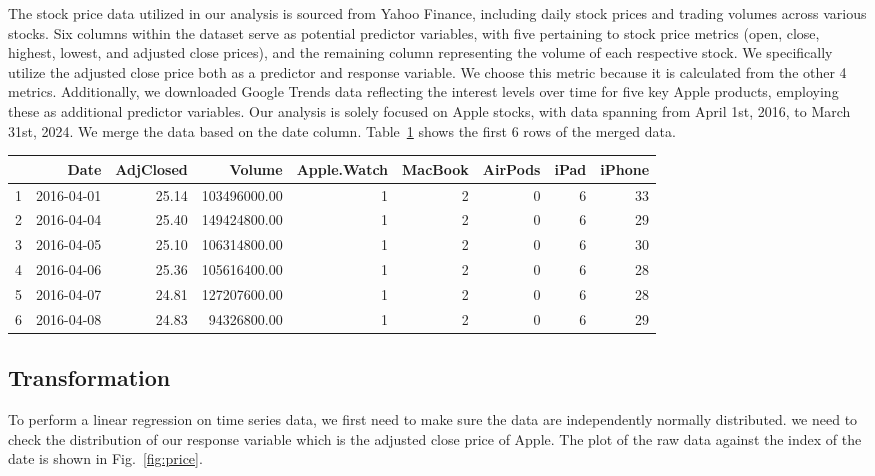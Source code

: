 \documentclass[conference,onecolumn,11pt]{IEEEtran}
\begin{document}
The stock price data utilized in our analysis is sourced from Yahoo Finance, including daily stock prices and trading volumes across various stocks. Six columns within the dataset serve as potential predictor variables, with five pertaining to stock price metrics (open, close, highest, lowest, and adjusted close prices), and the remaining column representing the volume of each respective stock. We specifically utilize the adjusted close price both as a predictor and response variable. We choose this metric because it is calculated from the other 4 metrics. Additionally, we downloaded Google Trends data reflecting the interest levels over time for five key Apple products, employing these as additional predictor variables. Our analysis is solely focused on Apple stocks, with data spanning from April 1st, 2016, to March 31st, 2024. We merge the data based on the date column. Table~\ref{tab:merged_data} shows the first 6 rows of the merged data.

\begin{table}[ht]
\centering
\begin{tabular}{rrrrrrrrr}
  \hline
 & Date & AdjClosed & Volume & Apple.Watch & MacBook & AirPods & iPad & iPhone \\ 
  \hline
1 & 2016-04-01 & 25.14 & 103496000.00 &   1 &   2 &   0 &   6 &  33 \\ 
  2 & 2016-04-04 & 25.40 & 149424800.00 &   1 &   2 &   0 &   6 &  29 \\ 
  3 & 2016-04-05 & 25.10 & 106314800.00 &   1 &   2 &   0 &   6 &  30 \\ 
  4 & 2016-04-06 & 25.36 & 105616400.00 &   1 &   2 &   0 &   6 &  28 \\ 
  5 & 2016-04-07 & 24.81 & 127207600.00 &   1 &   2 &   0 &   6 &  28 \\ 
  6 & 2016-04-08 & 24.83 & 94326800.00 &   1 &   2 &   0 &   6 &  29 \\ 
   \hline
\end{tabular}
\label{tab:merged_data}
\end{table}

\subsection*{Transformation}

To perform a linear regression on time series data, we first need to make sure the data are independently normally distributed. we need to check the distribution of our response variable which is the adjusted close price of Apple.
The plot of the raw data against the index of the date is shown in Fig.~\ref{fig:price}.
\end{document}
